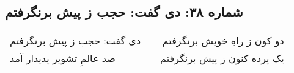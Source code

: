 \begin{center}
\section*{شماره ۳۸: دی گفت: حجب ز پیش برنگرفتم}
\label{sec:038}
\begin{longtable}{l p{0.5cm} r}
دی گفت: حجب ز پیش برنگرفتم
&&
دو کون ز راهِ خویش برنگرفتم
\\
صد عالمِ تشویر پدیدار آمد
&&
یک پرده کنون ز پیش برنگرفتم
\\
\end{longtable}
\end{center}
